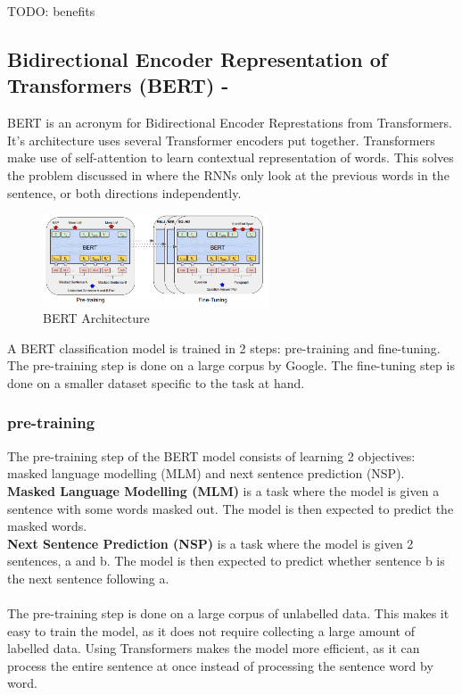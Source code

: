 TODO: benefits
\subsection{Bidirectional Encoder Representation of Transformers (BERT) - \cite{BERT}}
BERT is an acronym for Bidirectional Encoder Represtations from Transformers. It's architecture uses several Transformer encoders
put together. Transformers make use of self-attention to learn contextual representation of words. This solves the problem
discussed in  where the RNNs only look at the previous words in the sentence, or both directions independently.
\begin{figure}[hbtp]
    \centering
    \includegraphics[width=0.6\textwidth]{../images/bert.png}
    \caption{BERT Architecture}
    \label{fig:bert}
\end{figure}

A BERT classification model is trained in 2 steps: pre-training and fine-tuning. The pre-training step is done on a large corpus
by Google. The fine-tuning step is done on a smaller dataset specific to the task at hand.

\subsubsection{pre-training}
The pre-training step of the BERT model consists of learning 2 objectives: masked language modelling (MLM) and next sentence prediction
(NSP).\\
\textbf{Masked Language Modelling (MLM)} is a task where the model is given a sentence with some words masked out. The model is then
expected to predict the masked words.\\
\textbf{Next Sentence Prediction (NSP)} is a task where the model is given 2 sentences, a and b. The model is then expected to predict
whether sentence b is the next sentence following a.\\\\

The pre-training step is done on a large corpus of unlabelled data. This makes it easy to train the model, as it does not require
collecting a large amount of labelled data. Using Transformers makes the model more efficient, as it can process the entire sentence
at once instead of processing the sentence word by word.


